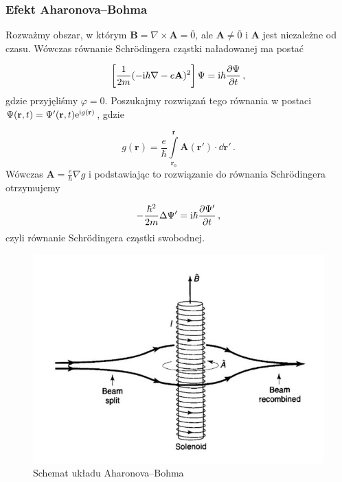 \documentclass{myclass}
\begin{document}
\subsubsection{Efekt Aharonova--Bohma}

Rozważmy obszar, w którym \(\mathbf{B}=\nabla\times\mathbf{A}=\overline{0}\), ale
\(\mathbf{A}\neq\overline{0}\) i \(\mathbf{A}\) jest niezależne od czasu. Wówczas równanie
Schr{\"o}dingera cząstki naładowanej ma postać

\begin{equation*}
\left[\frac{1}{2m}(-\mathrm{i}\hbar\nabla-e\mathbf{A})^2\right]\Psi=\mathrm{i}\hbar\pdv{\Psi}{t}\,,
\end{equation*}
gdzie przyjęliśmy \(\varphi= 0\). Poszukajmy rozwiązań tego równania w postaci
\(\Psi(\mathbf{r},t)=\Psi'(\mathbf{r},t)\mathrm{e}^{\mathrm{i} g(\mathbf{r})}\), gdzie

\begin{equation*}
g(\mathbf{r})=\frac{e}{\hbar}\int\limits_{\mathbf{r}_0}^\mathbf{r}\mathbf{A}(\mathbf{r}')\cdot\dd{\mathbf{r}'}\,.
\end{equation*}
Wówczas \(\mathbf{A}=\frac{e}{\hbar}\nabla g\) i podstawiając to rozwiązanie do równania
Schr{\"o}dingera otrzymujemy

\begin{equation*}
-\frac{\hbar^2}{2m}\Delta\Psi'=\mathrm{i}\hbar\pdv{\Psi'}{t}\,,
\end{equation*}
czyli równanie Schr{\"o}dingera cząstki swobodnej. 

\begin{figure}[ht]
    \centering
    \includegraphics[scale=0.3]{diag/aharonov-bohm-diagram.jpg}
    \caption{Schemat układu Aharonova--Bohma}
    \label{aharonov-bohm}
\end{figure}
\end{document}
